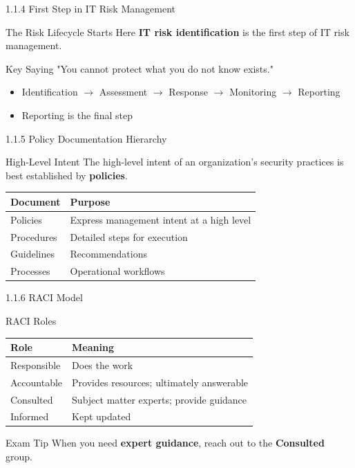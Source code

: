 \documentclass{beamer}
\begin{document}
	\begin{frame}{1.1.4 First Step in IT Risk Management}
		\begin{block}{The Risk Lifecycle Starts Here}
			\textbf{IT risk identification} is the first step of IT risk management.
		\end{block}
		\begin{exampleblock}{Key Saying}
			"You cannot protect what you do not know exists."
		\end{exampleblock}
		\begin{itemize}
			\item Identification $\rightarrow$ Assessment $\rightarrow$ Response $\rightarrow$ Monitoring $\rightarrow$ Reporting
			\item Reporting is the final step
		\end{itemize}
	\end{frame}
	
	\begin{frame}{1.1.5 Policy Documentation Hierarchy}
		\begin{block}{High-Level Intent}
			The high-level intent of an organization's security practices is best established by \textbf{policies}.
		\end{block}
		\begin{tabular}{|p{3cm}|p{8cm}|}
			\hline
			\textbf{Document} & \textbf{Purpose} \\
			\hline
			Policies & Express management intent at a high level \\
			\hline
			Procedures & Detailed steps for execution \\
			\hline
			Guidelines & Recommendations \\
			\hline
			Processes & Operational workflows \\
			\hline
		\end{tabular}
	\end{frame}
	
	\begin{frame}{1.1.6 RACI Model}
		\begin{block}{RACI Roles}
			\begin{tabular}{|p{2.5cm}|p{8cm}|}
				\hline
				\textbf{Role} & \textbf{Meaning} \\
				\hline
				Responsible & Does the work \\
				\hline
				Accountable & Provides resources; ultimately answerable \\
				\hline
				Consulted & Subject matter experts; provide guidance \\
				\hline
				Informed & Kept updated \\
				\hline
			\end{tabular}
		\end{block}
		\begin{alertblock}{Exam Tip}
			When you need \textbf{expert guidance}, reach out to the \textbf{Consulted} group.
		\end{alertblock}
	\end{frame}
	
\end{document}
